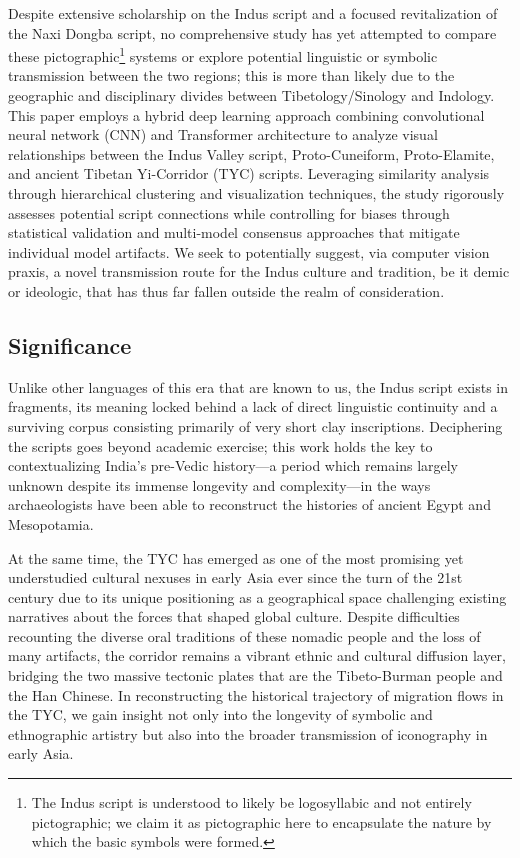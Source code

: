 \documentclass[11pt,a4paper,oneside]{report}
\begin{document}
Despite extensive scholarship on the Indus script and a focused revitalization of the Naxi Dongba script, no comprehensive study has yet attempted to compare these pictographic\footnote{The Indus script is understood to likely be logosyllabic and not entirely pictographic; we claim it as pictographic here to encapsulate the nature by which the basic symbols were formed.} systems or explore potential linguistic or symbolic transmission between the two regions; this is more than likely due to the geographic and disciplinary divides between Tibetology/Sinology and Indology. This paper employs a hybrid deep learning approach combining convolutional neural network (CNN) and Transformer architecture to analyze visual relationships between the Indus Valley script, Proto-Cuneiform, Proto-Elamite, and ancient Tibetan Yi-Corridor (TYC) scripts. Leveraging similarity analysis through hierarchical clustering and visualization techniques, the study rigorously assesses potential script connections while controlling for biases through statistical validation and multi-model consensus approaches that mitigate individual model artifacts. We seek to potentially suggest, via computer vision praxis, a novel transmission route for the Indus culture and tradition, be it demic or ideologic, that has thus far fallen outside the realm of consideration.

\subsection{Significance}
\noindent\hspace{1cm}
Unlike other languages of this era that are known to us, the Indus script exists in fragments, its meaning locked behind a lack of direct linguistic continuity and a surviving corpus consisting primarily of very short clay inscriptions. Deciphering the scripts goes beyond academic exercise; this work holds the key to contextualizing India's pre-Vedic history—a period which remains largely unknown despite its immense longevity and complexity—in the ways archaeologists have been able to reconstruct the histories of ancient Egypt and Mesopotamia.

At the same time, the TYC has emerged as one of the most promising yet understudied cultural nexuses in early Asia ever since the turn of the 21st century \cite{shi_ethnic_2018} due to its unique positioning as a geographical space challenging existing narratives about the forces that shaped global culture. Despite difficulties recounting the diverse oral traditions of these nomadic people and the loss of many artifacts, the corridor remains a vibrant ethnic and cultural diffusion layer, bridging the two massive tectonic plates that are the Tibeto-Burman people and the Han Chinese. In reconstructing the historical trajectory of migration flows in the TYC, we gain insight not only into the longevity of symbolic and ethnographic artistry but also into the broader transmission of iconography in early Asia.
\end{document}
